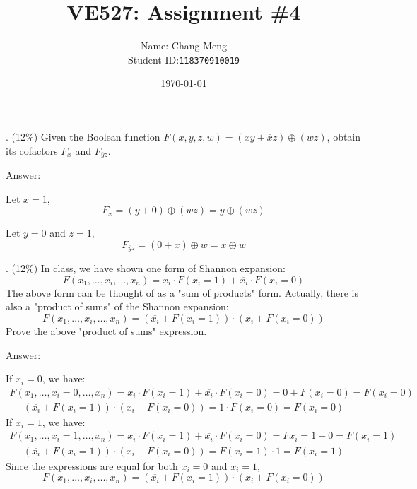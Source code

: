 \documentclass[12pt]{article}
\title{VE527: Assignment \#4} %
\author{Name: Chang Meng\\Student ID:\@\texttt{118370910019}}
\date{\today}
\begin{document}
    \maketitle

    . (12\%) Given the Boolean function $F(x,y,z,w)=(xy+\overline{x}z)\oplus(wz)$, obtain
    its cofactors $F_x$ and $F_{\overline{y}z}$.

    \noindent
    Answer:

    \noindent
    Let $x=1$,
    \[F_x=(y+0)\oplus(wz)=y\oplus(wz)\]

    \noindent
    Let $y=0$ and $z=1$,
    \[F_{\overline{y}z}=(0+\overline{x})\oplus w=\overline{x}\oplus w\]

    \vspace{12pt}
    . (12\%) In class, we have shown one form of Shannon expansion:
    \[F(x_1,\dots,x_i,\dots,x_n)=x_i \cdot F(x_i=1)+\overline{x_i}\cdot F(x_i=0)\]
    \noindent
    The above form can be thought of as a "sum of products" form. Actually, there is also a
    "product of sums" of the Shannon expansion:
    \[F(x_1,\dots,x_i,\dots,x_n)=(\overline{x_i}+F(x_i=1))\cdot (x_i+F(x_i=0))\]
    \noindent
    Prove the above "product of sums" expression.

    \noindent
    Answer:

    \noindent
    If $x_i=0$, we have:
    \[
        \begin{split}
            F(x_1,\dots,x_i=0,\dots,x_n) =
            x_i \cdot F(x_i=1)+\overline{x_i}\cdot F(x_i=0) =
            0 + F(x_i = 0) =
            F(x_i=0)
        \end{split}
    \]
    \[
        \begin{split}
            (\overline{x_i}+F(x_i=1))\cdot (x_i+F(x_i=0)) =
            1 \cdot F(x_i=0) =
            F(x_i=0)
        \end{split}
    \]
    \noindent
    If $x_i=1$, we have:
    \[
        \begin{split}
            F(x_1,\dots,x_i=1,\dots,x_n) =
            x_i \cdot F(x_i=1)+\overline{x_i}\cdot F(x_i=0) =
            F{x_i = 1} + 0 =
            F(x_i = 1)
        \end{split}
    \]
    \[
        \begin{split}
            (\overline{x_i}+F(x_i=1))\cdot (x_i+F(x_i=0)) =
            F(x_i=1) \cdot 1 =
            F(x_i=1)
        \end{split}
    \]
    Since the expressions are equal for both $x_i=0$ and $x_i=1$,
    \[F(x_1,\dots,x_i,\dots,x_n)=(\overline{x_i}+F(x_i=1))\cdot (x_i+F(x_i=0))\]
\end{document}
